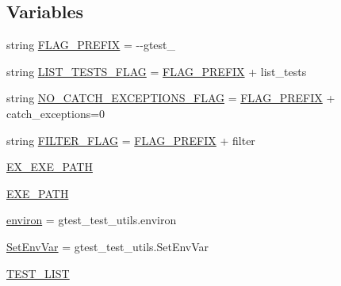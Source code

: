\subsection*{Variables}
\begin{DoxyCompactItemize}
\item 
string \mbox{\hyperlink{namespacegoogletest-catch-exceptions-test_ab8cc08f04bdda52f24b382ecac3ff310}{F\+L\+A\+G\+\_\+\+P\+R\+E\+F\+IX}} = \textquotesingle{}-\/-\/gtest\+\_\+\textquotesingle{}
\item 
string \mbox{\hyperlink{namespacegoogletest-catch-exceptions-test_add81248503390e72cfc23683951a1717}{L\+I\+S\+T\+\_\+\+T\+E\+S\+T\+S\+\_\+\+F\+L\+AG}} = \mbox{\hyperlink{namespacegoogletest-catch-exceptions-test_ab8cc08f04bdda52f24b382ecac3ff310}{F\+L\+A\+G\+\_\+\+P\+R\+E\+F\+IX}} + \textquotesingle{}list\+\_\+tests\textquotesingle{}
\item 
string \mbox{\hyperlink{namespacegoogletest-catch-exceptions-test_a6db016858ef7b94b823eb0ea159f4ef0}{N\+O\+\_\+\+C\+A\+T\+C\+H\+\_\+\+E\+X\+C\+E\+P\+T\+I\+O\+N\+S\+\_\+\+F\+L\+AG}} = \mbox{\hyperlink{namespacegoogletest-catch-exceptions-test_ab8cc08f04bdda52f24b382ecac3ff310}{F\+L\+A\+G\+\_\+\+P\+R\+E\+F\+IX}} + \textquotesingle{}catch\+\_\+exceptions=0\textquotesingle{}
\item 
string \mbox{\hyperlink{namespacegoogletest-catch-exceptions-test_a492a71486bad11e49a96d5b1b97cd1b5}{F\+I\+L\+T\+E\+R\+\_\+\+F\+L\+AG}} = \mbox{\hyperlink{namespacegoogletest-catch-exceptions-test_ab8cc08f04bdda52f24b382ecac3ff310}{F\+L\+A\+G\+\_\+\+P\+R\+E\+F\+IX}} + \textquotesingle{}filter\textquotesingle{}
\item 
\mbox{\hyperlink{namespacegoogletest-catch-exceptions-test_a9d4f56b684ab4356faea3b9640072a7a}{E\+X\+\_\+\+E\+X\+E\+\_\+\+P\+A\+TH}}
\item 
\mbox{\hyperlink{namespacegoogletest-catch-exceptions-test_a188751df0f5c5c09a9cbb394ef711725}{E\+X\+E\+\_\+\+P\+A\+TH}}
\item 
\mbox{\hyperlink{namespacegoogletest-catch-exceptions-test_ac016f17c70e0883eb6b14abcfaf5da44}{environ}} = gtest\+\_\+test\+\_\+utils.\+environ
\item 
\mbox{\hyperlink{namespacegoogletest-catch-exceptions-test_aa87a06c3b29e680c311b77240c61d745}{Set\+Env\+Var}} = gtest\+\_\+test\+\_\+utils.\+Set\+Env\+Var
\item 
\mbox{\hyperlink{namespacegoogletest-catch-exceptions-test_a8002b73eafb58268e677846819651377}{T\+E\+S\+T\+\_\+\+L\+I\+ST}}
\item 

\end{DoxyCompactItemize}
